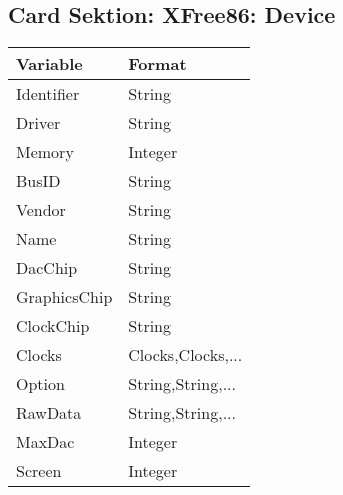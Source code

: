 \subsection{Card Sektion: XFree86: Device}
\begin{tabular}[h]{|p{5cm}|p{7cm}|}
 \hline
 \textbf{Variable}     & \textbf{Format}        \\
 \hline
 Identifier      & String                             \\
 Driver          & String                             \\
 Memory          & Integer                            \\
 BusID           & String                             \\
 Vendor          & String                             \\
 Name            & String                             \\
 DacChip         & String                             \\
 GraphicsChip    & String                             \\
 ClockChip       & String                             \\
 Clocks          & Clocks,Clocks,...                  \\
 Option          & String,String,...                  \\
 RawData         & String,String,...                  \\
 MaxDac          & Integer                            \\
 Screen          & Integer                            \\
 \hline
\end{tabular}


